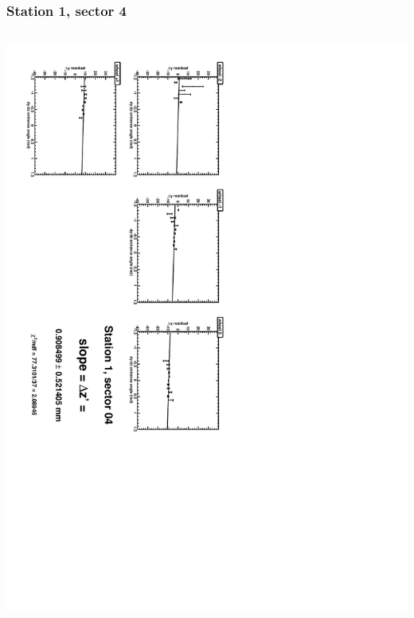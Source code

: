 \documentclass[compress]{beamer}
\begin{document}
\begin{frame}
\frametitle{Station 1, sector 4}
\begin{columns}
\includegraphics[height=\linewidth, angle=90]{zfits/zfit_1_04.pdf}


\end{columns}
\end{frame}
\end{document}
